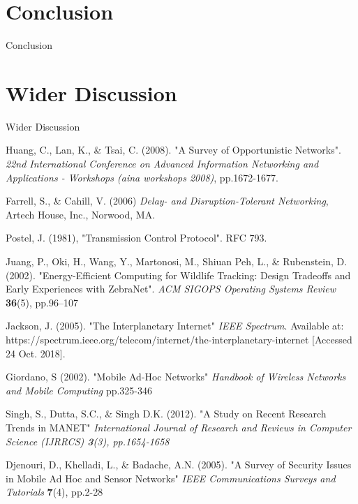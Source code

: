\documentclass{article}
\begin{document}
\restoregeometry

\clearpage

\section{Conclusion}
Conclusion

\section{Wider Discussion}
Wider Discussion

\begin{thebibliography}{20}

Huang, C., Lan, K., \& Tsai, C. (2008). 
"A Survey of Opportunistic Networks". 
\textit{22nd International Conference on Advanced Information Networking and Applications - Workshops (aina workshops 2008)}, pp.1672-1677.

Farrell, S., \& Cahill, V. (2006) \textit{Delay- and Disruption-Tolerant Networking}, Artech House, Inc., Norwood, MA.

Postel, J. (1981), "Transmission Control Protocol". RFC 793.

Juang, P., Oki, H., Wang, Y., Martonosi, M., Shiuan Peh, L., \& Rubenstein, D. (2002).
"Energy-Efficient Computing for Wildlife Tracking: Design Tradeoffs and Early Experiences with ZebraNet".
\textit{ACM SIGOPS Operating Systems Review} \textbf{36}(5), pp.96–107

Jackson, J. (2005). 
"The Interplanetary Internet"
\textit{IEEE Spectrum}. Available at: https://spectrum.ieee.org/telecom/internet/the-interplanetary-internet [Accessed 24 Oct. 2018].

Giordano, S (2002).
"Mobile Ad-Hoc Networks"
\textit{Handbook of Wireless Networks and Mobile Computing} pp.325-346

Singh, S., Dutta, S.C., \& Singh D.K. (2012). 
"A Study on Recent Research Trends in MANET"
\textit{International Journal of Research and Reviews in Computer Science (IJRRCS) \textbf{3}(3), pp.1654-1658} 

Djenouri, D., Khelladi, L., \& Badache, A.N. (2005).
"A Survey of Security Issues in Mobile Ad Hoc and Sensor Networks"
\textit{IEEE Communications Surveys and Tutorials} \textbf{7}(4), pp.2-28


\end{thebibliography}
\end{document}
